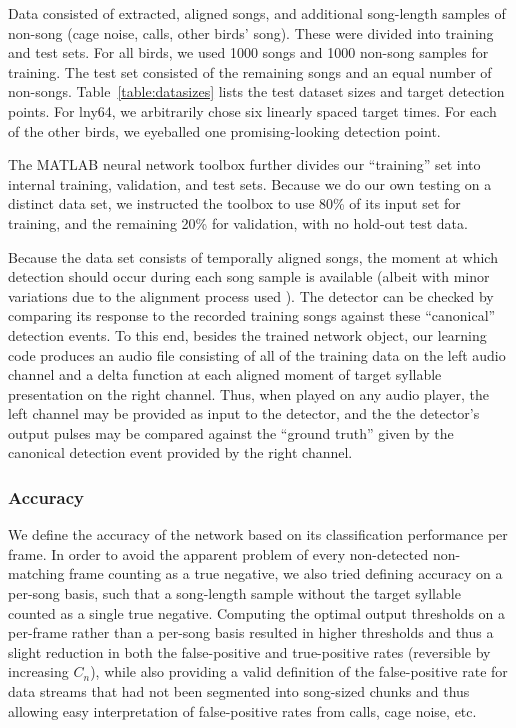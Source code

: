 \documentclass[10pt,letterpaper]{article}
\begin{document}
Data consisted of extracted, aligned songs, and additional song-length
samples of non-song (cage noise, calls, other birds' song). These were
divided into training and test sets. For all birds, we used 1000 songs
and 1000 non-song samples for training. The test set consisted of the remaining songs and an equal number of non-songs. Table~\ref{table:datasizes}
lists the test dataset sizes and target detection points. For lny64,
we arbitrarily chose six linearly spaced target times. For each of the
other birds, we eyeballed one promising-looking detection point.

The MATLAB neural network toolbox further divides our ``training'' set
into internal training, validation, and test sets.  Because we do our
own testing on a distinct data set, we instructed the
toolbox to use 80\% of its input set for training, and the
remaining 20\% for validation, with no hold-out test data.

Because the data set consists of temporally aligned songs, the moment
at which detection should occur during each song sample is available
(albeit with minor variations due to the alignment process used
\cite{Poole2012}).  The detector can be checked by comparing its
response to the recorded training songs against these ``canonical''
detection events.  To this end, besides the trained network object,
our learning code produces an audio file consisting of all of the
training data on the left audio channel and a delta function at each
aligned moment of target syllable presentation on the right
channel. Thus, when played on any audio player, the left channel may
be provided as input to the detector, and the the detector's output
pulses may be compared against the ``ground truth'' given by the
canonical detection event provided by the right channel.


\subsubsection{Accuracy}
\label{sec:accuracy}


We define the accuracy of the network based on its classification
performance per frame. In order to avoid the apparent problem of every
non-detected non-matching frame counting as a true negative, we also
tried defining accuracy on a per-song basis, such that a song-length
sample without the target syllable counted as a single true negative.
Computing the optimal output thresholds on a per-frame rather than a
per-song basis resulted in higher thresholds and thus a slight
reduction in both the false-positive and true-positive rates
(reversible by increasing $C_n$), while also providing a valid
definition of the false-positive rate for data streams that had not been
segmented into song-sized chunks and thus allowing easy interpretation
of false-positive rates from calls, cage noise, etc.
\end{document}
